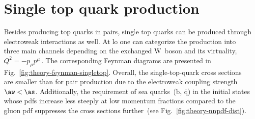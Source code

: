 \section{Single top quark production}
\label{sec:theory-single-top-production}

Besides producing top quarks in pairs, single top quarks can be produced through electroweak interactions as well. At \gls{lo} one can categorize the production into three main channels depending on the exchanged $\mathrm{W}$~boson and its virtuality, $Q^{2}=-p_{\mu}p^{\mu}$\,. The corresponding Feynman diagrams are presented in Fig.~\ref{fig:theory-feynman-singletop}. Overall, the single-top-quark cross sections are smaller than for pair production due to the electroweak coupling strength $\aw<\as$. Additionally, the requirement of sea quarks~($\mathrm{b}$, $\bar{\mathrm{q}}$) in the initial states whose \glspl{pdf} increase less steeply at low momentum fractions compared to the gluon \gls{pdf} suppresses the cross sections further~(see Fig.~\ref{fig:theory-nnpdf-dist}).

